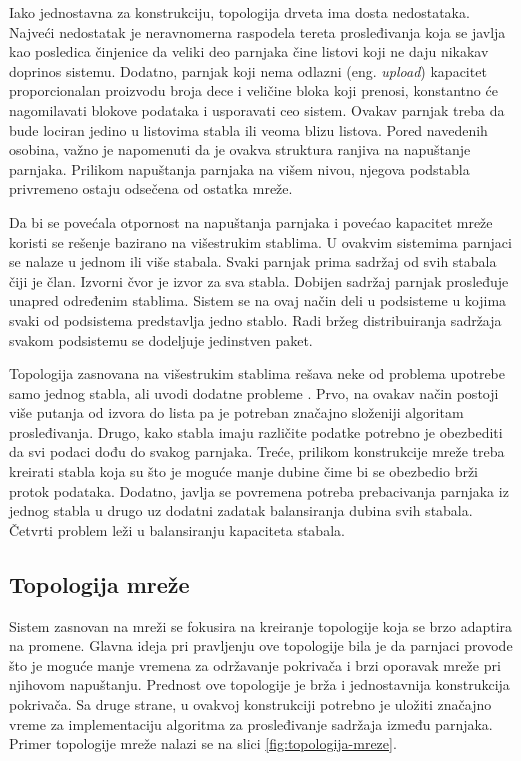 \documentclass[12pt,oneside]{memoir}
\begin{document}
Iako jednostavna za konstrukciju, topologija drveta ima dosta nedostataka. Najveći nedostatak je neravnomerna raspodela tereta prosleđivanja koja se javlja kao posledica činjenice da veliki deo parnjaka čine listovi koji ne daju nikakav doprinos sistemu. Dodatno, parnjak koji nema odlazni (eng. \textit{upload}) kapacitet proporcionalan proizvodu broja dece i veličine bloka koji prenosi, konstantno će nagomilavati blokove podataka i usporavati ceo sistem. Ovakav parnjak treba da bude lociran jedino u listovima stabla ili veoma blizu listova. 
Pored navedenih osobina, važno je napomenuti da je ovakva struktura ranjiva na napuštanje parnjaka. Prilikom napuštanja parnjaka na višem nivou, njegova podstabla privremeno ostaju odsečena od ostatka mreže.

Da bi se povećala otpornost na napuštanja parnjaka i povećao kapacitet mreže koristi se rešenje bazirano na višestrukim stablima. U ovakvim sistemima parnjaci se nalaze u jednom ili više stabala. Svaki parnjak prima sadržaj od svih stabala čiji je član. Izvorni čvor je izvor za sva stabla. Dobijen sadržaj parnjak prosleđuje unapred određenim stablima. Sistem se na ovaj način deli u podsisteme u kojima svaki od podsistema predstavlja jedno stablo. Radi bržeg distribuiranja sadržaja svakom podsistemu se dodeljuje jedinstven paket.

Topologija zasnovana na višestrukim stablima rešava neke od problema upotrebe samo jednog stabla, ali uvodi dodatne probleme \cite{DeBoever07}. Prvo, na ovakav način postoji više putanja od izvora do lista pa je potreban značajno složeniji algoritam prosleđivanja. Drugo, kako stabla imaju različite podatke potrebno je obezbediti da svi podaci dođu do svakog parnjaka. Treće, prilikom konstrukcije mreže treba kreirati stabla koja su što je moguće manje dubine čime bi se obezbedio brži protok podataka. Dodatno, javlja se povremena potreba prebacivanja parnjaka iz jednog stabla u drugo uz dodatni zadatak balansiranja dubina svih stabala. Četvrti problem leži u balansiranju kapaciteta stabala. 

\subsection{Topologija mreže}
\label{P2P.3.2}

Sistem zasnovan na mreži se fokusira na kreiranje topologije koja se brzo adaptira na promene. Glavna ideja pri pravljenju ove topologije bila je da parnjaci provode što je moguće manje vremena za održavanje pokrivača i brzi oporavak mreže pri njihovom napuštanju. Prednost ove topologije je brža i jednostavnija konstrukcija pokrivača. Sa druge strane, u ovakvoj konstrukciji potrebno je uložiti značajno vreme za implementaciju algoritma za prosleđivanje sadržaja između parnjaka. Primer topologije mreže nalazi se na slici \ref{fig:topologija-mreze}.
 
\end{document}
